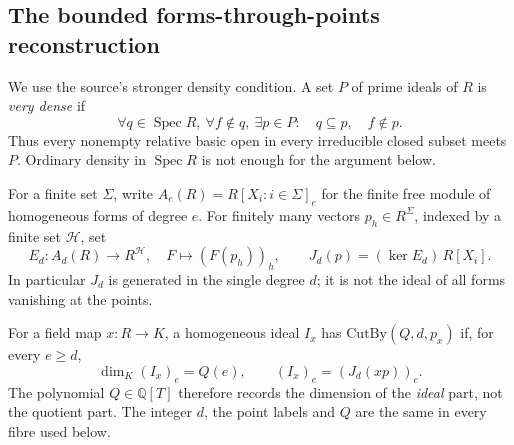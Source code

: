 \subsection{The bounded forms-through-points reconstruction}
\label{subsec:ftb-bounded-flat-projective-reconstruction}

We use the source's stronger density condition.
A set \(P\) of prime ideals of \(R\) is \emph{very dense} if
\[
 \forall q\in\operatorname{Spec}R,\ \forall f\notin q,\
 \exists p\in P:\quad q\subseteq p,\quad f\notin p.
 \tag{M6}\label{eq:ftb-very-dense-primes}
\]
Thus every nonempty relative basic open in every irreducible
closed subset meets \(P\).
Ordinary density in \(\operatorname{Spec}R\) is not enough
for the argument below.

For a finite set \(\Sigma\), write \(A_e(R)=R[X_i:i\in\Sigma]_e\)
for the finite free module of homogeneous forms of degree \(e\).
For finitely many vectors \(p_h\in R^\Sigma\), indexed by a
finite set \(\mathcal H\), set
\[
 E_d:A_d(R)\longrightarrow R^{\mathcal H},\quad
             F\longmapsto(F(p_h))_h,\qquad
             J_d(p)=(\ker E_d)\,R[X_i].
 \tag{M7}\label{eq:ftb-bounded-vanishing-ideal}
\]
In particular \(J_d\) is generated in the single degree \(d\);
it is not the ideal of all forms vanishing at the points.

For a field map \(x:R\to K\), a homogeneous ideal \(I_x\)
has \(\mathrm{CutBy}(Q,d,p_x)\) if, for every \(e\ge d\),
\[
 \dim_K(I_x)_e=Q(e),\qquad
       (I_x)_e=(J_d(xp))_e.
 \tag{M8}\label{eq:ftb-bounded-cutby}
\]
The polynomial \(Q\in\mathbb Q[T]\) therefore records the
dimension of the \emph{ideal} part, not the quotient part.
The integer \(d\), the point labels and \(Q\) are the same
in every fibre used below.

